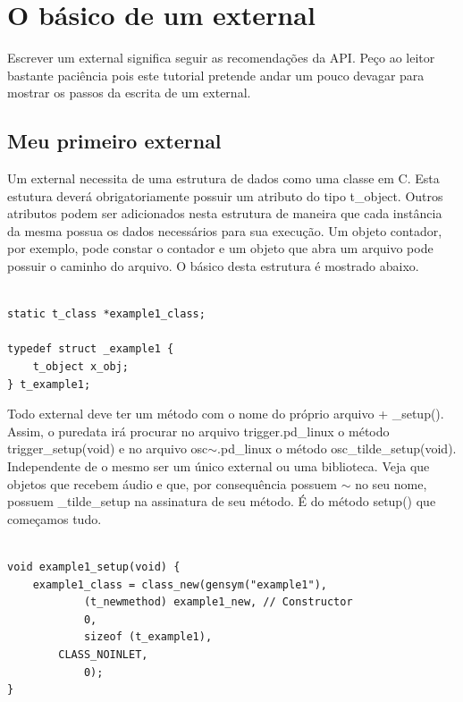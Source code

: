 \documentclass[10pt,a4paper]{report}
\begin{document}

\chapter{O básico de um external}

Escrever um external significa seguir as recomendações da API. Peço ao leitor bastante paciência pois este tutorial pretende andar um pouco devagar para mostrar os passos da escrita de um external.

\section{Meu primeiro external}

Um external necessita de uma estrutura de dados como uma classe em C. Esta estutura deverá obrigatoriamente possuir um atributo do tipo t\_object. Outros atributos podem ser adicionados nesta estrutura de maneira que cada instância da mesma possua os dados necessários para sua execução. Um objeto contador, por exemplo, pode constar o contador e um objeto que abra um arquivo pode possuir o caminho do arquivo. O básico desta estrutura é mostrado abaixo.

\begin{lstlisting}

static t_class *example1_class;

typedef struct _example1 {
    t_object x_obj;
} t_example1;
\end{lstlisting}

Todo external deve ter um método com o nome do próprio arquivo + \_setup(). Assim, o puredata irá procurar no arquivo trigger.pd\_linux o método trigger\_setup(void) e no arquivo osc$\sim$.pd\_linux o método osc\_tilde\_setup(void). Independente de o mesmo ser um único external ou uma biblioteca. Veja que objetos que recebem áudio e que, por consequência possuem $\sim$ no seu nome, possuem \_tilde\_setup na assinatura de seu método. É do método setup() que começamos tudo.

\begin{lstlisting}

void example1_setup(void) {
    example1_class = class_new(gensym("example1"),
            (t_newmethod) example1_new, // Constructor
            0,
            sizeof (t_example1),
	    CLASS_NOINLET,
            0);
}
\end{lstlisting}
\end{document}
